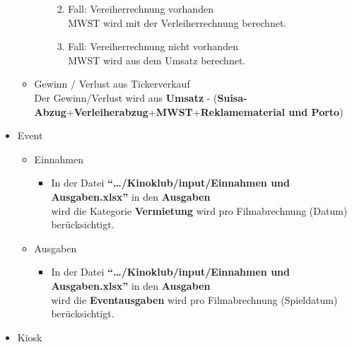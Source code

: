 \documentclass[
]{article}
\providecommand{\tightlist}{%
  \setlength{\itemsep}{0pt}\setlength{\parskip}{0pt}}
\begin{document}
\begin{itemize}
\begin{itemize}
\begin{itemize}
      \begin{enumerate}
      \def\labelenumi{\arabic{enumi}.}
      \tightlist
      \item
        Fall: Vereiherrechnung vorhanden\\
        MWST wird mit der Verleiherrechnung berechnet.
      \item
        Fall: Vereiherrechnung nicht vorhanden\\
        MWST wird aus dem Umsatz berechnet.\\
      \end{enumerate}
    \end{itemize}
  \item
    Gewinn / Verlust aus Tickerverkauf\\
    Der Gewinn/Verlust wird aus \textbf{Umsatz} -
    (\textbf{Suisa-Abzug}+\textbf{Verleiherabzug}+\textbf{MWST}+\textbf{Reklamematerial
    und Porto})
  \end{itemize}
\item
  Event

  \begin{itemize}
  \tightlist
  \item
    Einnahmen

    \begin{itemize}
    \tightlist
    \item
      In der Datei \textbf{``\ldots/Kinoklub/input/Einnahmen und
      Ausgaben.xlsx''} in den \textbf{Ausgaben}\\
      wird die Kategorie \textbf{Vermietung} wird pro Filmabrechnung
      (Datum) berücksichtigt.
    \end{itemize}
  \item
    Ausgaben

    \begin{itemize}
    \tightlist
    \item
      In der Datei \textbf{``\ldots/Kinoklub/input/Einnahmen und
      Ausgaben.xlsx''} in den \textbf{Ausgaben}\\
      wird die \textbf{Eventausgaben} wird pro Filmabrechnung
      (Spieldatum) berücksichtigt.
    \end{itemize}
  \end{itemize}
\item
  Kiosk


\end{itemize}
\end{document}
